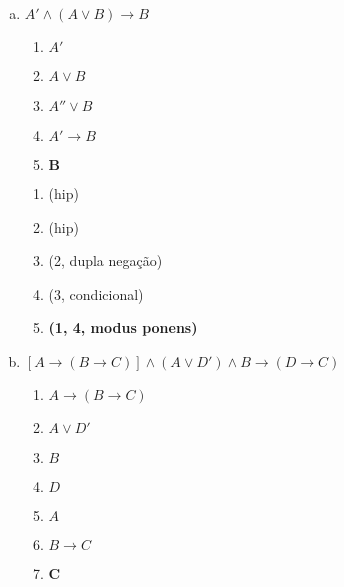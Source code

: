 \documentclass[a4paper, 12pt, addpoints]{exam}
\begin{document}
\begin{questions}
\begin{resp}
\begin{enumerate}[a)]
\begin{multicols}{2}
        \columnbreak

        \begin{enumerate}[\ding{32}]
          \item (hip)
          \item (hip da conclusão)
          \item (1, 2, modus ponens)
          \item \textbf{(2, 3, modus ponens)}
        \end{enumerate}

      \end{multicols}
      
      \item $A' \wedge (A \vee B) \rightarrow B$ \\
      \begin{multicols}{2}

        \begin{enumerate}[1.]
          \item $A'$
          \item $A \vee B$
          \item $A'' \vee B$
          \item $A' \rightarrow B$
          \item $\boldsymbol{B}$
        \end{enumerate}
        
        \columnbreak

        \begin{enumerate}[\ding{32}]
          \item (hip)
          \item (hip)
          \item (2, dupla negação)
          \item (3, condicional)
          \item \textbf{(1, 4, modus ponens)}
        \end{enumerate}

      \end{multicols}

      \item $[A \rightarrow (B \rightarrow C)] \wedge (A \vee D') \wedge B \rightarrow (D \rightarrow C)$ \\
      \begin{multicols}{2}

        \begin{enumerate}[1.]
          \item $A \rightarrow (B \rightarrow C)$
          \item $A \vee D'$
          \item $B$
          \item $D$
          \item $A$
          \item $B \rightarrow C$
          \item $\boldsymbol{C}$
        \end{enumerate}
        

\end{multicols}
\end{enumerate}
\end{resp}
\end{questions}
\end{document}
